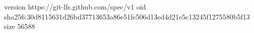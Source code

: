 version https://git-lfs.github.com/spec/v1
oid sha256:30d8115631d26bd37713653a86e51fe506d13ed4d21e5c13245f1275580b5f13
size 56588
